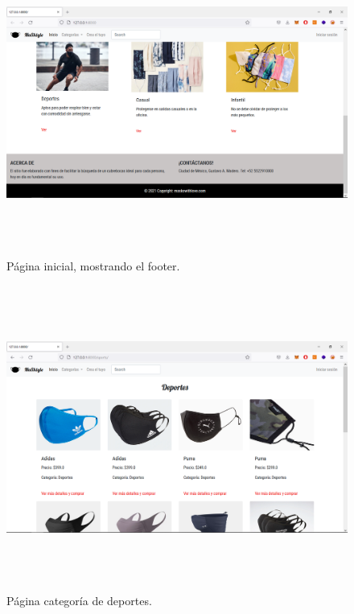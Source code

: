 \documentclass[letterpaper,12pt]{article}
\begin{document}
\begin{figure}[H]
	\includegraphics[width=18cm, height=10cm]{3}
	\centering
	\caption{Página inicial, mostrando el footer.}
\end{figure}
\begin{figure}[H]
	\includegraphics[width=18cm, height=10cm]{4}
	\centering
	\caption{Página categoría de deportes.}
\end{figure}
\end{document}
